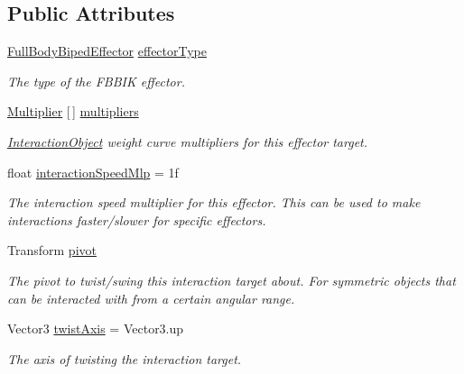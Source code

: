 \subsection*{Public Attributes}
\begin{DoxyCompactItemize}
\item 
\mbox{\hyperlink{namespace_root_motion_1_1_final_i_k_ae0dd2058c7667b6f132c11a6b860c14a}{Full\+Body\+Biped\+Effector}} \mbox{\hyperlink{class_root_motion_1_1_final_i_k_1_1_interaction_target_aee5d6153ee0db382892b8af4d3eaef49}{effector\+Type}}
\begin{DoxyCompactList}\small\item\em The type of the F\+B\+B\+IK effector. \end{DoxyCompactList}\item 
\mbox{\hyperlink{class_root_motion_1_1_final_i_k_1_1_interaction_target_1_1_multiplier}{Multiplier}} \mbox{[}$\,$\mbox{]} \mbox{\hyperlink{class_root_motion_1_1_final_i_k_1_1_interaction_target_ae8fd42003a4a2ee7f8dfd70aec0042c9}{multipliers}}
\begin{DoxyCompactList}\small\item\em \mbox{\hyperlink{class_root_motion_1_1_final_i_k_1_1_interaction_object}{Interaction\+Object}} weight curve multipliers for this effector target. \end{DoxyCompactList}\item 
float \mbox{\hyperlink{class_root_motion_1_1_final_i_k_1_1_interaction_target_a07a0f69b80289668ebc348e10164be6d}{interaction\+Speed\+Mlp}} = 1f
\begin{DoxyCompactList}\small\item\em The interaction speed multiplier for this effector. This can be used to make interactions faster/slower for specific effectors. \end{DoxyCompactList}\item 
Transform \mbox{\hyperlink{class_root_motion_1_1_final_i_k_1_1_interaction_target_a042a6f413a9ea2cb467dce6d8ed9739d}{pivot}}
\begin{DoxyCompactList}\small\item\em The pivot to twist/swing this interaction target about. For symmetric objects that can be interacted with from a certain angular range. \end{DoxyCompactList}\item 
Vector3 \mbox{\hyperlink{class_root_motion_1_1_final_i_k_1_1_interaction_target_a13656ac7b32e6a0c35673e41d9faee89}{twist\+Axis}} = Vector3.\+up
\begin{DoxyCompactList}\small\item\em The axis of twisting the interaction target. \end{DoxyCompactList}\item 

\end{DoxyCompactItemize}
